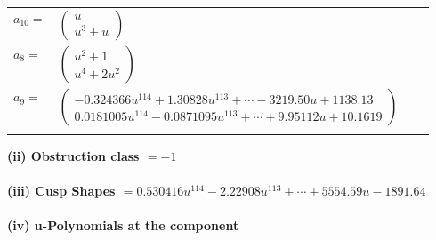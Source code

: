 \documentclass[1p]{elsarticle_modified}
\theoremstyle{definition}
\begin{document}
\begin{tabular}{m{7pt} m{180pt} m{7pt} m{180pt} }
\flushright $a_{10}=$&$\begin{pmatrix}u\\u^3+u\end{pmatrix}$ \\
\flushright $a_{8}=$&$\begin{pmatrix}u^2+1\\u^4+2 u^2\end{pmatrix}$ \\
\flushright $a_{9}=$&$\begin{pmatrix}-0.324366 u^{114}+1.30828 u^{113}+\cdots-3219.50 u+1138.13\\0.0181005 u^{114}-0.0871095 u^{113}+\cdots+9.95112 u+10.1619\end{pmatrix}$\\&\end{tabular}
\flushleft \textbf{(ii) Obstruction class $= -1$}\\~\\
\flushleft \textbf{(iii) Cusp Shapes $= 0.530416 u^{114}-2.22908 u^{113}+\cdots+5554.59 u-1891.64$}\\~\\
\newpage\renewcommand{\arraystretch}{1}
\flushleft \textbf{(iv) u-Polynomials at the component}\newline \\
\end{document}

